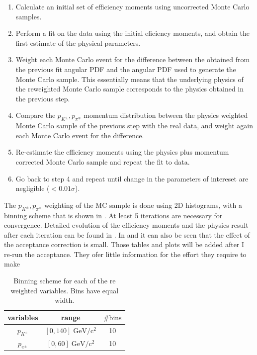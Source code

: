 \begin{enumerate}
\item Calculate an initial set of efficiency moments using uncorrected \BsJpsiKst Monte Carlo samples.
\item Perform a fit on the \BsJpsiKst data using the initial eficiency moments, and obtain the first estimate of the physical parameters.
\item Weight each Monte Carlo event for the difference between the obtained from the previous fit angular PDF and the angular PDF used to generate the Monte Carlo sample. 
      This essentially means that the underlying physics of the reweighted Monte Carlo sample corresponds to the physics obtained in the previous step.
\item Compare the $p_{K^{\pm}},p_{\pi^{\mp}}$ momentum distribution between the physics weighted Monte Carlo sample of the previous step with the 
      real data, and weight again each Monte Carlo event for the difference.
\item Re-estimate the efficiency moments using the physics plus momentum corrected \BsJpsiKst Monte Carlo sample and repeat the fit to \BsJpsiKst data.
\item Go back to step 4 and repeat until change in the parameters of intereset are negligible ($<0.01\sigma$).
\end{enumerate} 

The $p_{K^{\pm}},p_{\pi^{\mp}}$ weighting of the MC sample is done using 2D histograms, with a binning scheme that is shown in . 
At least 5 iterations are necessary for convergence. Detailed evolution of the efficiency moments and the physics result after each iteration
can be found in \appref{}. In \tabref{} and \figref{} it can also be seen that the effect of the acceptance correction is small. {\color{red}Those tables
and plots will be added after I re-run the acceptance. They ofer little information for the effort they require to make }

\begin{table}[!h]
  \center
  \caption{\small Binning scheme for each of the re weighted variables. Bins have equal width.}
  \begin{tabular}{c c c}
    \hline
     variables & range & $\# \text{bins}$ \\
    \hline
    $p_{K^{\pm}}$    &  $[0,140]    \;  \text{GeV}/\text{c}^2$  & 10      \\ 
    $p_{\pi^{\pm}}$  &  $[0,60]      \;  \text{GeV}/\text{c}^2$  & 10      \\ 
    \hline
  \end{tabular}
  \label{angAccBinning}
\end{table}


